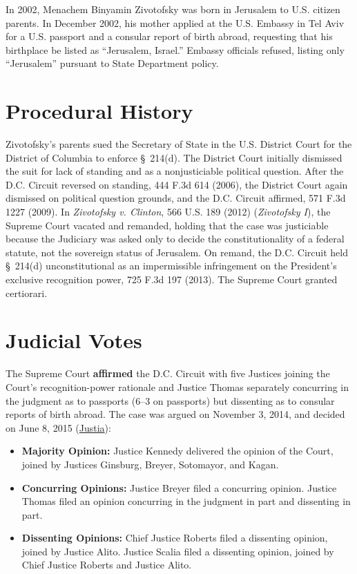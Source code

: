 \documentclass[12pt]{article}
\begin{document}
In 2002, Menachem Binyamin Zivotofsky was born in Jerusalem to U.S. citizen parents. In December 2002, his mother applied at the U.S. Embassy in Tel Aviv for a U.S. passport and a consular report of birth abroad, requesting that his birthplace be listed as ``Jerusalem, Israel.'' Embassy officials refused, listing only ``Jerusalem'' pursuant to State Department policy.

\section{Procedural History}
Zivotofsky's parents sued the Secretary of State in the U.S. District Court for the District of Columbia to enforce \S~214(d). The District Court initially dismissed the suit for lack of standing and as a nonjusticiable political question. After the D.C. Circuit reversed on standing, 444 F.3d 614 (2006), the District Court again dismissed on political question grounds, and the D.C. Circuit affirmed, 571 F.3d 1227 (2009). In \textit{Zivotofsky v. Clinton}, 566 U.S. 189 (2012) (\textit{Zivotofsky I}), the Supreme Court vacated and remanded, holding that the case was justiciable because the Judiciary was asked only to decide the constitutionality of a federal statute, not the sovereign status of Jerusalem. On remand, the D.C. Circuit held \S~214(d) unconstitutional as an impermissible infringement on the President's exclusive recognition power, 725 F.3d 197 (2013). The Supreme Court granted certiorari.

\section{Judicial Votes}
The Supreme Court \textbf{affirmed} the D.C. Circuit with five Justices joining the Court's recognition-power rationale and Justice Thomas separately concurring in the judgment as to passports (6--3 on passports) but dissenting as to consular reports of birth abroad. The case was argued on November 3, 2014, and decided on June 8, 2015 (\href{https://supreme.justia.com/cases/federal/us/576/1/}{Justia}):

\begin{itemize}
    \item \textbf{Majority Opinion:} Justice Kennedy delivered the opinion of the Court, joined by Justices Ginsburg, Breyer, Sotomayor, and Kagan.
    \item \textbf{Concurring Opinions:} Justice Breyer filed a concurring opinion. Justice Thomas filed an opinion concurring in the judgment in part and dissenting in part.
    \item \textbf{Dissenting Opinions:} Chief Justice Roberts filed a dissenting opinion, joined by Justice Alito. Justice Scalia filed a dissenting opinion, joined by Chief Justice Roberts and Justice Alito.
\end{itemize}
\end{document}

